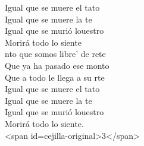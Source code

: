 \begin{cancion}
	Igual que se muere el tato\\
	Igual que se muere la te\\
	Igual que se murió louestro\\
	Morirá todo lo siente\\
	nto que somos libre' de rete\\
	Que ya ha pasado ese monto\\
	Que a todo le llega a su rte\\
	Igual que se muere el tato\\
	Igual que se muere la te\\
	Igual que se murió louestro\\
	Morirá todo lo siente.\\
<span id=cejilla-original>3</span>\\
\end{cancion}%
